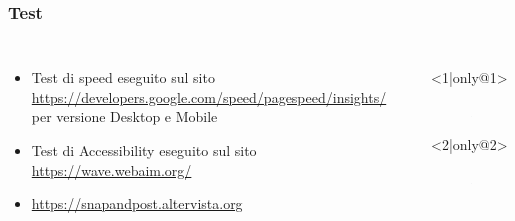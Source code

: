 \documentclass{beamer}
\begin{document}
\begin{frame}
\frametitle{Test}
\begin{columns}
\begin{itemize}
 	\item <1-> Test di speed eseguito sul sito \url{https://developers.google.com/speed/pagespeed/insights/} per versione Desktop e Mobile 
 	\item <3-> Test di Accessibility eseguito sul sito \url{https://wave.webaim.org/}
 	\item <3-> \url{https://snapandpost.altervista.org}
\end{itemize}

\begin{itemize}
	\item[] <1|only@1> 
		\begin{figure}[!h]
 			\centering
 			\includegraphics[scale=0.32]{"Immagini/speedDesktop.png"}
 		\end{figure}
 	\item[] <2|only@2> 
		\begin{figure}[!h]
 			\centering
 			\includegraphics[scale=0.32]{"Immagini/speedMobile.png"}

\end{figure}
\end{itemize}
\end{columns}
\end{frame}
\end{document}
